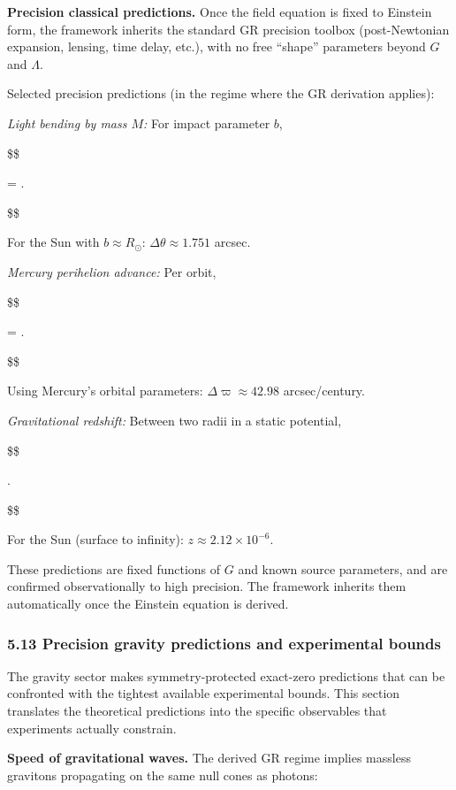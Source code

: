\documentclass[11pt,a4paper]{article}
\theoremstyle{remark}
\begin{document}
\textbf{Precision classical predictions.} Once the field equation is fixed to
Einstein form, the framework inherits the standard GR precision toolbox
(post-Newtonian expansion, lensing, time delay, etc.), with no free ``shape''
parameters beyond \(G\) and \(\Lambda\).

Selected precision predictions (in the regime where the GR derivation applies):

\emph{Light bending by mass \(M\):} For impact parameter \(b\),

\$\$

\Delta\theta = .

\$\$

For the Sun with \(b \approx R_\odot\): \(\Delta\theta \approx 1.751\) arcsec.

\emph{Mercury perihelion advance:} Per orbit,

\$\$

\Delta\varpi = .

\$\$

Using Mercury's orbital parameters: \(\Delta\varpi \approx 42.98\) arcsec/century.

\emph{Gravitational redshift:} Between two radii in a static potential,

\$\$

\frac{\Delta\nu}{\nu} \approx {}.

\$\$

For the Sun (surface to infinity): \(z \approx 2.12 \times 10^{-6}\).

These predictions are fixed functions of \(G\) and known source parameters, and
are confirmed observationally to high precision. The framework inherits them
automatically once the Einstein equation is derived.

\subsubsection{5.13 Precision gravity predictions and experimental bounds}\label{precision-gravity-predictions-and-experimental-bounds}

The gravity sector makes symmetry-protected exact-zero predictions that can be
confronted with the tightest available experimental bounds. This section
translates the theoretical predictions into the specific observables that
experiments actually constrain.

\textbf{Speed of gravitational waves.} The derived GR regime implies massless
gravitons propagating on the same null cones as photons:
\end{document}
